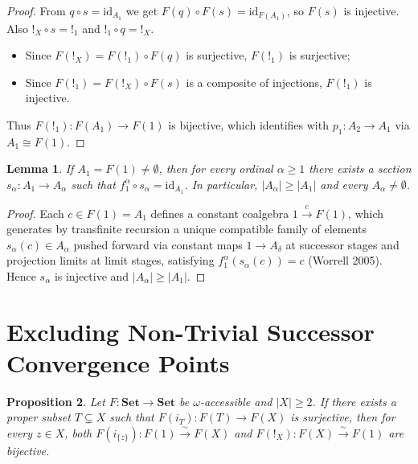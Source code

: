 \documentclass[11pt,a4paper]{article}
\theoremstyle{plain}
\newtheorem{lemma}{Lemma}[section]
\newtheorem{proposition}[lemma]{Proposition}
\newcommand{\id}{\mathrm{id}}
\newcommand{\Set}{\mathbf{Set}}
\begin{document}
\begin{proof}
From $q \circ s = \id_{A_1}$ we get $F(q) \circ F(s) = \id_{F(A_1)}$, so $F(s)$ is injective. Also ${!}_X \circ s = {!}_1$ and ${!}_1 \circ q = {!}_X$.
\begin{itemize}[leftmargin=2em]
  \item Since $F(!_X) = F(!_1) \circ F(q)$ is surjective, $F(!_1)$ is surjective;
  \item Since $F(!_1) = F(!_X) \circ F(s)$ is a composite of injections, $F(!_1)$ is injective.
\end{itemize}
Thus $F(!_1) : F(A_1) \to F(1)$ is bijective, which identifies with $p_1 : A_2 \to A_1$ via $A_1 \cong F(1)$.
\end{proof}

\begin{lemma}
If $A_1 = F(1) \neq \emptyset$, then for every ordinal $\alpha \ge 1$ there exists a section $s_\alpha : A_1 \to A_\alpha$ such that $f_1^\alpha \circ s_\alpha = \id_{A_1}$. In particular, $|A_\alpha| \ge |A_1|$ and every $A_\alpha \neq \emptyset$.
\end{lemma}

\begin{proof}
Each $c \in F(1) = A_1$ defines a constant coalgebra $1 \xrightarrow{c} F(1)$, which generates by transfinite recursion a unique compatible family of elements $s_\alpha(c) \in A_\alpha$ pushed forward via constant maps $1 \to A_\delta$ at successor stages and projection limits at limit stages, satisfying $f_1^\alpha(s_\alpha(c)) = c$ (Worrell 2005). Hence $s_\alpha$ is injective and $|A_\alpha| \ge |A_1|$.
\end{proof}

\section{Excluding Non-Trivial Successor Convergence Points}

\begin{proposition}
Let $F : \Set \to \Set$ be $\omega$-accessible and $|X| \ge 2$. If there exists a proper subset $T \subsetneq X$ such that $F(i_T) : F(T) \to F(X)$ is surjective, then for every $z \in X$, both $F(i_{\{z\}}) : F(1) \xrightarrow{\sim} F(X)$ and $F({!}_X) : F(X) \xrightarrow{\sim} F(1)$ are bijective.
\end{proposition}
\end{document}
